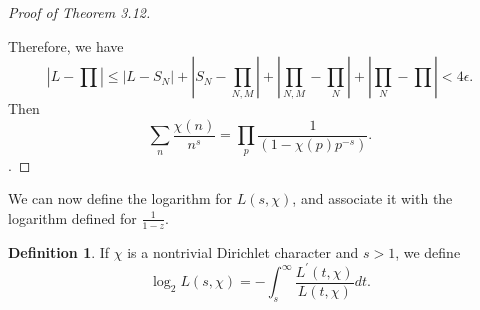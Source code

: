\documentclass[psamsfonts]{amsart}
\theoremstyle{definition}
\newtheorem{defn}[thm]{Definition}
\theoremstyle{remark}
\numberwithin{equation}{section}
\begin{document}
\begin{proof}[Proof of Theorem 3.12]
\begin{center}
			\end{center}
			\vspace{1mm}
			Therefore, we have
			\begin{equation}
				\left|L-\prod\right| \leq |L-S_N| + \left|S_N-\prod_{N,M}\right| + \left|\prod_{N,M} -\prod_N\right| + \left|\prod_N - \prod\right| < 4\epsilon.
			\end{equation}
			Then
			\begin{equation}
				\sum_{n} \frac{\chi(n)}{n^s} = \prod_{p} \frac{1}{(1-\chi(p)p^{-s})} .
			\end{equation}.
			\end{proof}
			
			We can now define the logarithm for $L(s,\chi)$, and associate it with the logarithm defined for $\frac{1}{1-z}$.
			
			\begin{defn}
				If $\chi$ is a nontrivial Dirichlet character and $s > 1$, we define
				\begin{equation}
					\log_2 L(s,\chi) = -\int_{s}^{\infty} \frac{L^{\prime}(t,\chi)}{L(t,\chi)} dt.
				\end{equation}
			\end{defn}
			
\end{document}
